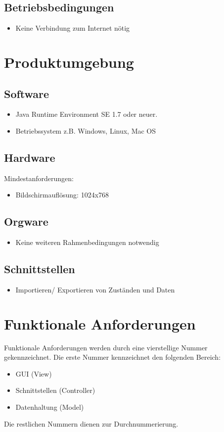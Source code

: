 \documentclass[10pt,a4paper]{article}
\begin{document}
\subsection{Betriebsbedingungen}
\begin{itemize}
\item Keine Verbindung zum Internet nötig
\end{itemize}


\section{Produktumgebung}
\subsection{Software}
\begin{itemize}
\item Java Runtime Environment SE 1.7 oder neuer.
\item Betriebssystem z.B. Windows, Linux, Mac OS
\end{itemize}


\subsection{Hardware}
Mindestanforderungen:
\begin{itemize}
\item Bildschirmauflösung: 1024x768
\end{itemize}


\subsection{Orgware}
\begin{itemize}
\item Keine weiteren Rahmenbedingungen notwendig
\end{itemize}


\subsection{Schnittstellen}
\begin{itemize}
\item Importieren/ Exportieren von Zuständen und Daten
\end{itemize}


\section{Funktionale Anforderungen}
Funktionale Anforderungen werden durch eine vierstellige Nummer gekennzeichnet. Die erste Nummer kennzeichnet den folgenden Bereich:
\begin{itemize}
	\item GUI (View)
	\item Schnittstellen (Controller)
	\item Datenhaltung (Model)
\end{itemize}
Die restlichen Nummern dienen zur Durchnummerierung.
\end{document}
